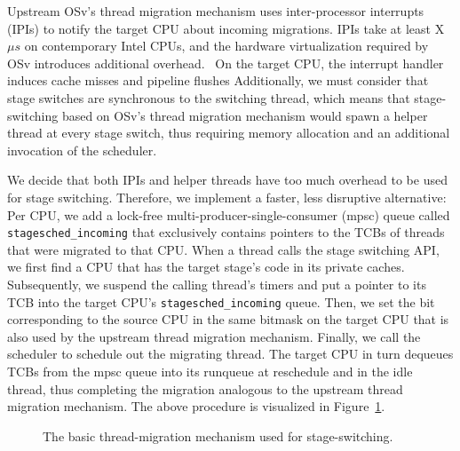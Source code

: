 \documentclass[12pt,a4paper]{book}
\begin{document}
Upstream OSv's thread migration mechanism uses inter-processor interrupts (IPIs) to notify the target CPU about incoming migrations.
IPIs take at least X $\mu s$ on contemporary Intel CPUs, and the hardware virtualization required by OSv introduces additional overhead.~
On the target CPU, the interrupt handler induces cache misses and pipeline flushes 
Additionally, we must consider that stage switches are synchronous to the switching thread, which means that stage-switching based on OSv's thread migration mechanism would spawn a helper thread at every stage switch, thus requiring memory allocation and an additional invocation of the scheduler.

We decide that both IPIs and helper threads have too much overhead to be used for stage switching.
Therefore, we implement a faster, less disruptive alternative:
Per CPU, we add a lock-free multi-producer-single-consumer (mpsc) queue called \lstinline[style=figurecpp]{stagesched_incoming} that exclusively contains pointers to the TCBs of threads that were migrated to that CPU.
When a thread calls the stage switching API, we first find a CPU that has the target stage's code in its private caches.
Subsequently, we suspend the calling thread's timers and put a pointer to its TCB into the target CPU's \lstinline[style=figurecpp]{stagesched_incoming} queue.
Then, we set the bit corresponding to the source CPU in the same bitmask on the target CPU that is also used by the upstream thread migration mechanism.
Finally, we call the scheduler to schedule out the migrating thread.
The target CPU in turn dequeues TCBs from the mpsc queue into its runqueue at reschedule and in the idle thread, thus completing the migration analogous to the upstream thread migration mechanism.
The above procedure is visualized in Figure~\ref{fig:di:mig:basic}.

\begin{figure}[H]
    \caption{The basic thread-migration mechanism used for stage-switching.}
    \label{fig:di:mig:basic}
\end{figure}
\end{document}
